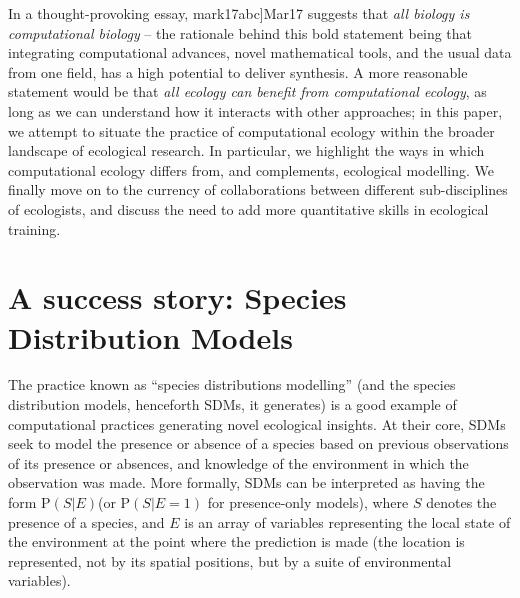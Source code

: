 \documentclass[11pt,serif]{article}
\begin{document}
In a thought-provoking essay,
\color{gray}{[}mark17abc{]}\color{black}\color{purple}Mar17\color{black}
suggests that \emph{all biology is computational biology} -- the
rationale behind this bold statement being that integrating
computational advances, novel mathematical tools, and the usual data
from one field, has a high potential to deliver synthesis. A more
reasonable statement would be that \emph{all ecology can benefit from
computational ecology}, as long as we can understand how it interacts
with other approaches; in this paper, we attempt to situate the practice
of computational ecology within the broader landscape of ecological
research. In particular, we highlight the ways in which computational
ecology differs from, and complements, ecological modelling. We finally
move on to the currency of collaborations between different
sub-disciplines of ecologists, and discuss the need to add more
quantitative skills in ecological training.

\section{A success story: Species Distribution
Models}\label{a-success-story-species-distribution-models}

The practice known as ``species distributions modelling'' (and the
species distribution models, henceforth SDMs, it generates) is a good
example of computational practices generating novel ecological insights.
At their core, SDMs seek to model the presence or absence of a species
based on previous observations of its presence or absences, and
knowledge of the environment in which the observation was made. More
formally, SDMs can be interpreted as having the form
\(\text{P}(S | E)\)\color{purple}(or \(\text{P}(S | E=1)\) for
presence-only models),\color{black} where \(S\) denotes the presence of
a species, and \(E\) is an array of variables representing the local
state of the environment at the point where the prediction is made (the
location is represented, not by its spatial positions, but by a suite of
environmental variables).
\end{document}

